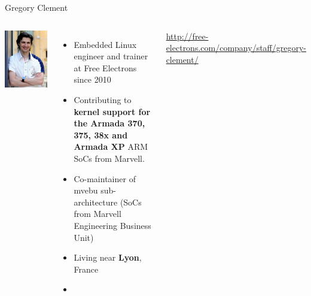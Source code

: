 \begin{frame}{Gregory Clement}
 \begin{columns}
    \includegraphics[width=\textwidth]{slides/first-slides/gregory-clement.jpg}
    \begin{itemize}
	\item Embedded Linux engineer and trainer at Free Electrons since 2010
  	\item Contributing to {\bf kernel support for the Armada 370, 375, 38x and
      	      Armada XP} ARM SoCs from Marvell.
  	\item Co-maintainer of mvebu sub-architecture (SoCs from Marvell
    	      Engineering Business Unit)
  	\item Living near {\bf Lyon}, France
    	\item {}
    \end{itemize}
    \url{http://free-electrons.com/company/staff/gregory-clement/}
 \end{columns}
\end{frame}
